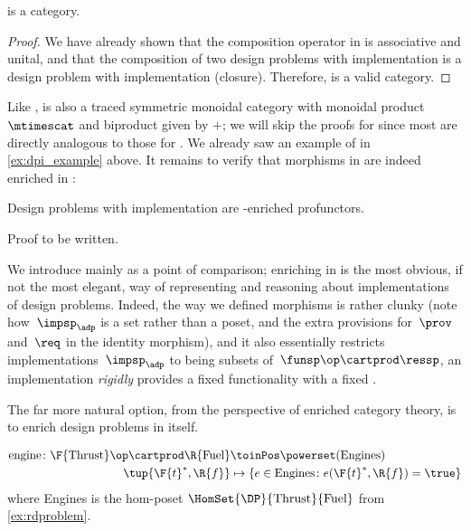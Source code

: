 {    \begin{lemma}
        \DPI is a category.
    \end{lemma}

    \begin{proof}
        We have already shown that the composition operator in \DPI is associative and unital, and that the composition of two design problems with implementation is a design problem with implementation (closure).
        Therefore, \DPI is a valid category.
    \end{proof}

    Like \DP, \DPI is also a traced symmetric monoidal category with monoidal product $\mtimescat$ and biproduct given by $+$;
    we will skip the proofs for \DPI since most are directly analogous to those for \DP.
    We already saw an example of \DPI in \cref{ex:dpi_example} above.
    It remains to verify that morphisms in \DPI are indeed enriched in \Set:

    \begin{proposition}
        Design problems with implementation are \Set-enriched profunctors.
    \end{proposition}
    \begin{publictodo}
        Proof to be written.
    \end{publictodo}
    We introduce \DPI mainly as a point of comparison; enriching in \Set is the most obvious, if not the most elegant, way of representing and reasoning about implementations of design problems.
    Indeed, the way we defined morphisms is rather clunky (note how~$\impsp_\adp$ is a set rather than a poset, and the extra provisions for~$\prov$ and~$\req$ in the identity morphism), and it also essentially restricts implementations~$\impsp_\adp$ to being subsets of~$\funsp\op \cartprod \ressp$, \ie  an implementation \emph{rigidly} provides a fixed functionality \fun with a fixed \res.

    The far more natural option, from the perspective of enriched category theory, is to enrich design problems in \DP itself.

    \begin{example}
        \begin{equation}
            \begin{aligned}
                \text{engine} \colon \F{\text{Thrust}}\op \cartprod \R{\text{Fuel}} & \toinPos \powerset(\text{Engines}) \\
                \tup{\F{t}^*,\R{f}}                                                 & \mapsto \{ e \in \text{Engines} \colon e(\F{t}^*, \R{f}) = \true \}
            \end{aligned}
        \end{equation}
        where Engines is the hom-poset $\HomSet{\DP}{\text{Thrust}}{\text{Fuel}}$ from \cref{ex:rdproblem}.
    \end{example}

}
